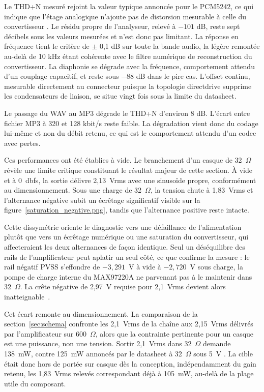 Le THD+N mesuré rejoint la valeur typique annoncée pour le PCM5242, ce qui indique que l'étage analogique n'ajoute pas de distorsion mesurable à celle du convertisseur \cite{TI_PCM5242}. Le résidu propre de l'analyseur, relevé à $-101$ dB, reste sept décibels sous les valeurs mesurées et n'est donc pas limitant. La réponse en fréquence tient le critère de $\pm$ 0,1 dB sur toute la bande audio, la légère remontée au-delà de 10 kHz étant cohérente avec le filtre numérique de reconstruction du convertisseur. La \gls{diaphonie} se dégrade avec la fréquence, comportement attendu d'un couplage capacitif, et reste sous $-88$ dB dans le pire cas. L'offset continu, mesurable directement au connecteur puisque la topologie \gls{directdrive} supprime les condensateurs de liaison, se situe vingt fois sous la limite du datasheet.

Le passage du WAV au MP3 dégrade le THD+N d'environ 8 dB. L'écart entre fichier MP3 à 320 et 128 kbit/s reste faible. La dégradation vient donc du codage lui-même et non du débit retenu, ce qui est le comportement attendu d'un codec avec pertes.

Ces performances ont été établies à vide. Le branchement d'un casque de 32~$\Omega$ révèle une limite critique constituant le résultat majeur de cette section. À vide et à 0~\gls{dbfs}, la sortie délivre 2,13~Vrms avec une sinusoïde propre, conformément au dimensionnement. Sous une charge de 32~$\Omega$, la tension chute à 1,83~Vrms et l'alternance négative subit un écrêtage significatif visible sur la figure~\ref{saturation_negative.png}, tandis que l'alternance positive reste intacte.


Cette dissymétrie oriente le diagnostic vers une défaillance de l'alimentation plutôt que vers un écrêtage numérique ou une saturation du convertisseur, qui affecteraient les deux alternances de façon identique. Seul un déséquilibre des rails de l'amplificateur peut aplatir un seul côté, ce que confirme la mesure : le rail négatif PVSS s'effondre de $-3,291$~V à vide à $-2,720$~V sous charge, la pompe de charge interne du MAX97220A ne parvenant pas à le maintenir dans 32~$\Omega$. La crête négative de 2,97~V requise pour 2,1~Vrms devient alors inatteignable~\cite{analog_MAX97220A}.

Cet écart remonte au dimensionnement. La comparaison de la section~\ref{sec:schema} confronte les 2,1~Vrms de la chaîne aux 2,15~Vrms délivrés par l'amplificateur sur 600~$\Omega$, alors que la contrainte pertinente pour un casque est une puissance, non une tension. Sortir 2,1~Vrms dans 32~$\Omega$ demande 138~mW, contre 125~mW annoncés par le datasheet à 32~$\Omega$ sous 5~V \cite{analog_MAX97220A}. La cible était donc hors de portée sur casque dès la conception, indépendamment du gain retenu, les 1,83~Vrms relevés correspondant déjà à 105~mW, au-delà de la plage utile du composant.

